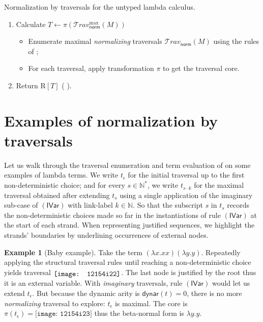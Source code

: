 \documentclass[xchauthor,chkrefs,GCNS,amsmath,amsthm,rotating,leaveRGB]{tcsg}
\theoremstyle{plain}
\theoremstyle{definition}
\newtheorem{example}{Example}[section]
\newcommand\travset{\mathcal{T}\!rav}
\newcommand{\normalizing}{\mathsf{norm}}
\newcommand{\travsetnorm}{\travset_{\normalizing}}
\def\readout{\mathrm{R}}
\def\coresymbol{\pi}
\newcommand{\core}[1]{\coresymbol(#1)}
\newcommand{\dynar}{\textsf{dynar}}
\begin{document}
\begin{algorithm}[t]
\caption{Normalization by traversals for the untyped lambda calculus.}\label{algo:ulc_normalization_by_traversals}
\begin{algorithmic}
%
\begin{enumerate}
\item Calculate $T \leftarrow \core{\travsetnorm ^{\max }(M)}$
%
\begin{itemize}
\item Enumerate maximal \emph{normalizing} traversals $\travsetnorm (M)$
    using the rules of
    ;
\item For each traversal, apply transformation $\coresymbol $ to get the
    traversal core.
\end{itemize}
\item Return $\readout [T]$ ( ).
\end{enumerate}
\end{algorithmic}
\end{algorithm}

\section{Examples of normalization by traversals}\label{sec:examples}

Let us walk through the traversal enumeration and term evaluation of
 on some
examples of lambda terms. We write $t_\epsilon $  for the initial traversal
up to the first non-deterministic choice; and for every $s \in \mathbb
{N}^{*}$, we write $t_{s \cdot k}$ for the maximal traversal obtained after
extending $t_{s}$ using a single application of the imaginary sub-case of
$\mathsf{(IVar)}$ with link-label $k \in \mathbb {N}$. So that the subscript
$s$ in $t_{s}$ records the non-deterministic choices made so far in the
instantiations of rule $\mathsf{(IVar)}$ at the start of each strand. When
representing justified sequences, we highlight the strands' boundaries by
underlining occurrences of external nodes.


\begin{example}[Baby example]\label{examp:baby}
Take the term $(\lambda x. x x) (\lambda y. y)$. Repeatedly applying the
structural traversal rules until reaching a non-deterministic choice yields
traversal $\raisebox{-2pt}{\texttt{[image: 12154i22]}}$. The last node is justified by the
root thus it is an external variable. With \emph{imaginary} traversals, rule
$\mathbf {(\mathsf{IVar})}$ would let us extend $t_\epsilon $. But because
the dynamic arity is $\dynar (t) = 0$, there is no more \emph{normalizing}
traversal to explore: $t_\epsilon $ is maximal. The core is $\core{t_\epsilon
} = {\texttt{[image: 12154i23]}}$ thus the beta-normal form is $\lambda y . y$.
\end{example}
\end{document}
